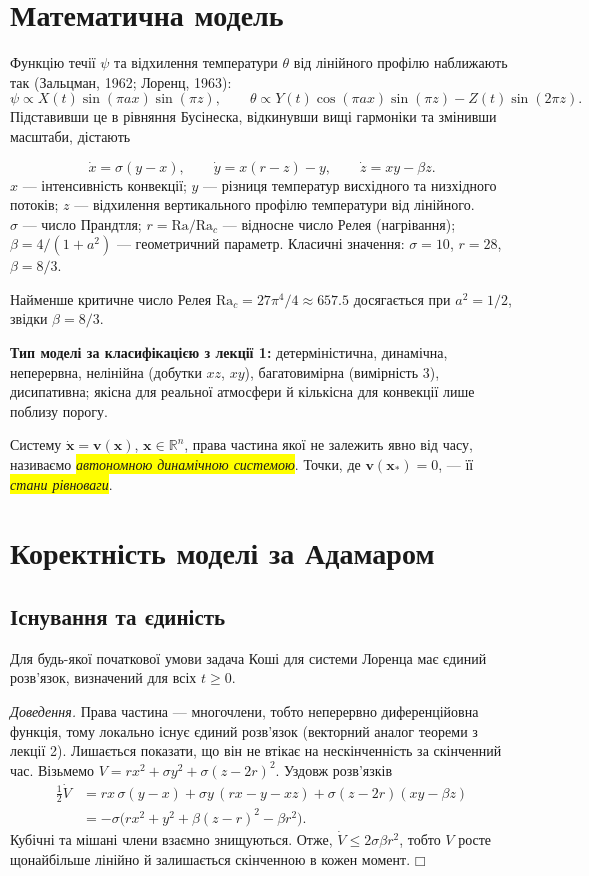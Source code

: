 \documentclass[11pt,a4paper]{article}
\newcommand{\term}[1]{\colorbox{Mark}{\textit{#1}}}
\begin{document}
\section{Математична модель}
Функцію течії $\psi$ та відхилення температури $\theta$ від лінійного профілю наближають так
(Зальцман, 1962; Лоренц, 1963):
\[
\psi\propto X(t)\sin(\pi a x)\sin(\pi z),\qquad
\theta\propto Y(t)\cos(\pi a x)\sin(\pi z)-Z(t)\sin(2\pi z).
\]
Підставивши це в рівняння Бусінеска, відкинувши вищі гармоніки та змінивши масштаби, дістають
\begin{tcolorbox}[lec]
\[
\dot x=\sigma(y-x),\qquad \dot y=x(r-z)-y,\qquad \dot z=xy-\beta z .
\]
$x$ — інтенсивність конвекції; $y$ — різниця температур висхідного та низхідного потоків;
$z$ — відхилення вертикального профілю температури від лінійного.\\
$\sigma$ — число Прандтля; $r=\mathrm{Ra}/\mathrm{Ra}_c$ — відносне число Релея (нагрівання);
$\beta=4/(1+a^2)$ — геометричний параметр. Класичні значення: $\sigma=10$, $r=28$, $\beta=8/3$.
\end{tcolorbox}
Найменше критичне число Релея $\mathrm{Ra}_c=27\pi^4/4\approx657.5$ досягається при $a^2=1/2$,
звідки $\beta=8/3$.

\textbf{Тип моделі за класифікацією з лекції 1:} детерміністична, динамічна, неперервна,
нелінійна (добутки $xz$, $xy$), багатовимірна (вимірність 3), дисипативна; якісна для реальної
атмосфери й кількісна для конвекції лише поблизу порогу.

\begin{defbox}
Систему $\dot{\mathbf x}=\mathbf v(\mathbf x)$, $\mathbf x\in\mathbb R^n$, права частина якої не
залежить явно від часу, називаємо \term{автономною динамічною системою}. Точки, де
$\mathbf v(\mathbf x_*)=0$, — її \term{стани рівноваги}.
\end{defbox}

\section{Коректність моделі за Адамаром}
\subsection{Існування та єдиність}
\begin{thmbox}
Для будь-якої початкової умови задача Коші для системи Лоренца має єдиний розв'язок, визначений
для всіх $t\ge 0$.
\end{thmbox}
\textit{Доведення.} Права частина — многочлени, тобто неперервно диференційовна функція, тому
локально існує єдиний розв'язок (векторний аналог теореми з лекції 2). Лишається показати, що він
не втікає на нескінченність за скінченний час. Візьмемо $V=rx^2+\sigma y^2+\sigma(z-2r)^2$.
Уздовж розв'язків
\begin{align*}
\tfrac12\dot V&=rx\,\sigma(y-x)+\sigma y\,(rx-y-xz)+\sigma(z-2r)(xy-\beta z)\\
&=-\sigma\bigl(rx^2+y^2+\beta(z-r)^2-\beta r^2\bigr).
\end{align*}
Кубічні та мішані члени взаємно знищуються. Отже, $\dot V\le 2\sigma\beta r^2$, тобто $V$ росте
щонайбільше лінійно й залишається скінченною в кожен момент. \hfill$\mdlgwhtsquare$
\end{document}
